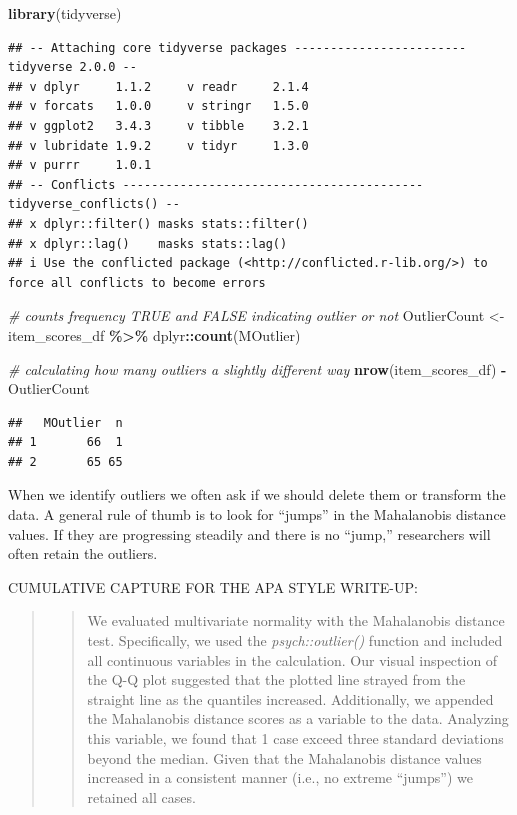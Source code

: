\documentclass[
  11pt,
]{book}
\newenvironment{Shaded}{\begin{snugshade}}{\end{snugshade}}
\newcommand{\CommentTok}[1]{\textcolor[rgb]{0.37,0.37,0.37}{\textit{#1}}}
\newcommand{\FunctionTok}[1]{\textcolor[rgb]{0.27,0.27,0.27}{\textbf{#1}}}
\newcommand{\NormalTok}[1]{#1}
\newcommand{\OtherTok}[1]{\textcolor[rgb]{0.37,0.37,0.37}{#1}}
\newcommand{\SpecialCharTok}[1]{\textcolor[rgb]{0.43,0.43,0.43}{\textbf{#1}}}
\begin{document}
\begin{Shaded}
\begin{Highlighting}[]
\FunctionTok{library}\NormalTok{(tidyverse)}
\end{Highlighting}
\end{Shaded}

\begin{verbatim}
## -- Attaching core tidyverse packages ------------------------ tidyverse 2.0.0 --
## v dplyr     1.1.2     v readr     2.1.4
## v forcats   1.0.0     v stringr   1.5.0
## v ggplot2   3.4.3     v tibble    3.2.1
## v lubridate 1.9.2     v tidyr     1.3.0
## v purrr     1.0.1     
## -- Conflicts ------------------------------------------ tidyverse_conflicts() --
## x dplyr::filter() masks stats::filter()
## x dplyr::lag()    masks stats::lag()
## i Use the conflicted package (<http://conflicted.r-lib.org/>) to force all conflicts to become errors
\end{verbatim}

\begin{Shaded}
\begin{Highlighting}[]
\CommentTok{\# counts frequency TRUE and FALSE indicating outlier or not}
\NormalTok{OutlierCount }\OtherTok{\textless{}{-}}\NormalTok{ item\_scores\_df }\SpecialCharTok{\%\textgreater{}\%}
\NormalTok{    dplyr}\SpecialCharTok{::}\FunctionTok{count}\NormalTok{(MOutlier)}

\CommentTok{\# calculating how many outliers a slightly different way}
\FunctionTok{nrow}\NormalTok{(item\_scores\_df) }\SpecialCharTok{{-}}\NormalTok{ OutlierCount}
\end{Highlighting}
\end{Shaded}

\begin{verbatim}
##   MOutlier  n
## 1       66  1
## 2       65 65
\end{verbatim}

When we identify outliers we often ask if we should delete them or transform the data. A general rule of thumb is to look for ``jumps'' in the Mahalanobis distance values. If they are progressing steadily and there is no ``jump,'' researchers will often retain the outliers.

CUMULATIVE CAPTURE FOR THE APA STYLE WRITE-UP:

\begin{quote}
\begin{quote}
We evaluated multivariate normality with the Mahalanobis distance test. Specifically, we used the \emph{psych::outlier()} function and included all continuous variables in the calculation. Our visual inspection of the Q-Q plot suggested that the plotted line strayed from the straight line as the quantiles increased. Additionally, we appended the Mahalanobis distance scores as a variable to the data. Analyzing this variable, we found that 1 case exceed three standard deviations beyond the median. Given that the Mahalanobis distance values increased in a consistent manner (i.e., no extreme ``jumps'') we retained all cases.
\end{quote}
\end{quote}
\end{document}
